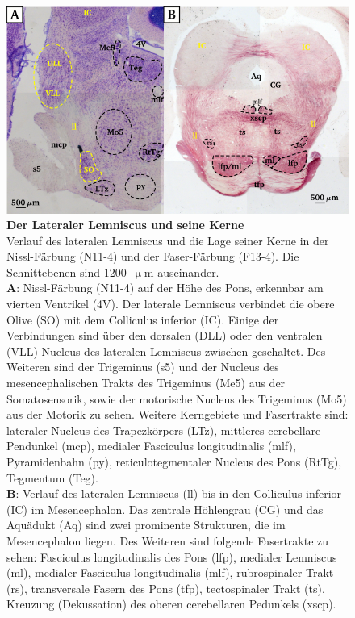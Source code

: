 \documentclass[12pt,a4paper,pdftex]{article}
\begin{document}
\begin{figure}[H]
    \centering
    \includegraphics[width = \textwidth]{pictures/auditory/lateral_lemniscus.png}
    \caption[Der Lateraler Lemniscus und seine Kerne]{\textbf{Der Lateraler Lemniscus und seine Kerne}\\ 
    Verlauf des lateralen Lemniscus und die Lage seiner Kerne in der Nissl-Färbung (N11-4) und der Faser-Färbung (F13-4). Die Schnittebenen sind 1200~$\upmu$m auseinander.\\
    \textbf{A}: Nissl-Färbung (N11-4) auf der Höhe des Pons, erkennbar am vierten Ventrikel (4V).
    Der laterale Lemniscus verbindet die obere Olive (SO) mit dem Colliculus inferior (IC). Einige der Verbindungen sind über den dorsalen (DLL) oder den ventralen (VLL) Nucleus des lateralen Lemniscus zwischen geschaltet. 
    Des Weiteren sind der Trigeminus (s5) und der Nucleus des mesencephalischen Trakts des Trigeminus (Me5) aus der Somatosensorik, sowie der motorische Nucleus des Trigeminus (Mo5) aus der Motorik zu sehen. 
    Weitere Kerngebiete und Fasertrakte sind: lateraler Nucleus des Trapezkörpers (LTz), mittleres cerebellare Pendunkel (mcp), medialer Fasciculus longitudinalis (mlf), Pyramidenbahn (py), reticulotegmentaler Nucleus des Pons (RtTg), Tegmentum (Teg).\\
    \textbf{B}: Verlauf des lateralen Lemniscus (ll) bis in den Colliculus inferior (IC) im Mesencephalon. Das zentrale Höhlengrau (CG) und das Aquädukt (Aq) sind zwei prominente Strukturen, die im Mesencephalon liegen. Des Weiteren sind folgende Fasertrakte zu sehen: Fasciculus longitudinalis des Pons (lfp), medialer Lemniscus (ml), medialer Fasciculus longitudinalis (mlf), rubrospinaler Trakt (rs), transversale Fasern des Pons (tfp), tectospinaler Trakt (ts), Kreuzung (Dekussation) des oberen cerebellaren Pedunkels (xscp).}
    \label{fig:lateraler_lemniscus}
\end{figure}
\end{document}
